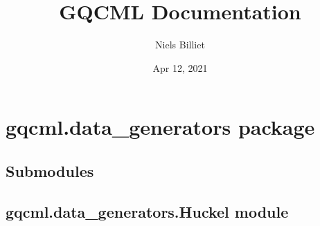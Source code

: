 \documentclass[letterpaper,10pt,english]{sphinxmanual}
\title{GQCML Documentation}
\date{Apr 12, 2021}
\author{Niels Billiet}
\begin{document}
\pagestyle{empty}
\sphinxmaketitle
\pagestyle{plain}
\sphinxtableofcontents
\pagestyle{normal}
\label{\detokenize{index::doc}}



\chapter{gqcml.data\_generators package}
\label{\detokenize{modules/gqcml.data_generators:gqcml-data-generators-package}}\label{\detokenize{modules/gqcml.data_generators::doc}}

\section{Submodules}
\label{\detokenize{modules/gqcml.data_generators:submodules}}

\section{gqcml.data\_generators.Huckel module}
\label{\detokenize{modules/gqcml.data_generators:module-gqcml.data_generators.Huckel}}\label{\detokenize{modules/gqcml.data_generators:gqcml-data-generators-huckel-module}}
\end{document}
